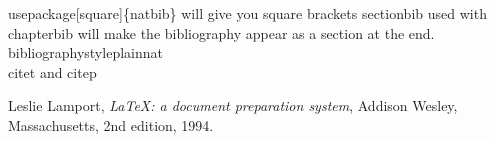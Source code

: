 \documentclass{Welly_Workbook}
\begin{document}
usepackage[square]\{natbib\} will give you square brackets
sectionbib used with chapterbib will make the bibliography appear as a section at the end.\\
bibliographystyle{plainnat}\citep{lamport94}\\
\vspace{0.2in}
citet and citep\

\begin{thebibliography}{9}

  Leslie Lamport,
  \emph{\LaTeX: a document preparation system},
  Addison Wesley, Massachusetts,
  2nd edition,
  1994.

\end{thebibliography}
\end{document}
